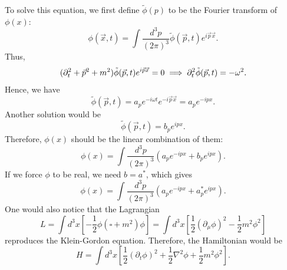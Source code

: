 \documentclass[11pt]{article}
\theoremstyle{definition}
\begin{document}
To solve this equation, we first define $\tilde{\phi}(p)$ to be the Fourier transform of $\phi(x)$:
\begin{equation}
    \phi(\vec{x}, t) = \int \frac{d^3p}{(2\pi)^3} \tilde{\phi}(\vec{p}, t)e^{i\vec{p}  \vec{x}}.
\end{equation}
Thus,
\begin{equation}
    (\partial_t^2  + \vec{p}^2+m^2)\tilde{\phi}(\vec{p}, t)e^{i\vec{p}\vec{x}} = 0 \\
    \implies \partial_t^2 \tilde{\phi}(\vec{p}, t) = -\omega^2.
\end{equation}
Hence, we have
\begin{equation}
    \tilde{\phi}(\vec{p}, t)  = a_pe^{-i\omega t}e^{-i\vec{p}\vec{x}} = a_pe^{-ipx}.
\end{equation}
Another solution would be
\begin{equation}
    \tilde{\phi}(\vec{p}, t)  = b_pe^{ipx}.
\end{equation}
Therefore, $\phi(x)$ should be the linear combination of them:
\begin{equation}
    \phi(x) = \int \frac{d^3p}{(2\pi)^3} (a_pe^{-ipx} + b_pe^{ipx}).
\end{equation}
If we force $\phi$ to be real, we need $b = a^*$, which gives
\begin{equation}
    \phi(x) = \int \frac{d^3p}{(2\pi)^3} (a_pe^{-ipx} + a_p^*e^{ipx}).
    \label{Eq. phi classic}
\end{equation}
One would also notice that the Lagrangian
\begin{equation}
    L = \int d^3 x \left[-\frac{1}{2}\phi (\square + m^2)\phi \right] = \int d^3 x \left[\frac{1}{2}(\partial_\mu \phi)^2 - \frac{1}{2}m^2\phi^2 \right] 
\end{equation}
reproduces the Klein-Gordon equation. Therefore, the Hamiltonian would be
\begin{equation}
    H = \int d^3x \left[\frac{1}{2}(\partial_t \phi)^2 + \frac{1}{2}\nabla^2\phi + \frac{1}{2}m^2\phi^2\right].
\end{equation}
\end{document}
